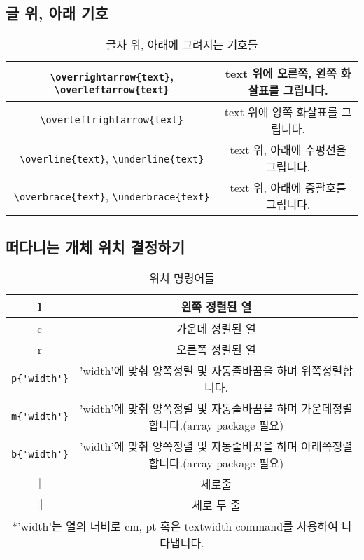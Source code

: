 \subsection{글 위, 아래 기호}
\begin{table}[hp]
	\centering
	\begin{tabular}{|c|c|}
		\hline
		\verb|\overrightarrow{text}|, \verb|\overleftarrow{text}| & text 위에 오른쪽, 왼쪽 화살표를 그립니다.\\
		\hline
		\verb|\overleftrightarrow{text}| & text 위에 양쪽 화살표를 그립니다.\\
		\hline
		\verb|\overline{text}|, \verb|\underline{text}| & text 위, 아래에 수평선을 그립니다.\\
		\hline
		\verb|\overbrace{text}|, \verb|\underbrace{text}| & text 위, 아래에 중괄호를 그립니다.\\
		\hline
	\end{tabular}
	\caption{글자 위, 아래에 그려지는 기호들}
	\label{tab:overunder}
\end{table}

\subsection{떠다니는 개체 위치 결정하기}
\begin{table}[hp]
	\centering
	\begin{tabular}{|c|c|}
		\hline
		l & 왼쪽 정렬된 열\\
		\hline
		c & 가운데 정렬된 열\\
		\hline
		r & 오른쪽 정렬된 열\\
		\hline
		\verb|p{'width'}| & 'width'에 맞춰 양쪽정렬 및 자동줄바꿈을 하며 위쪽정렬합니다.\\
		\hline
		\verb|m{'width'}| & 'width'에 맞춰 양쪽정렬 및 자동줄바꿈을 하며 가운데정렬합니다.(array package 필요)\\
		\hline
		\verb|b{'width'}| & 'width'에 맞춰 양쪽정렬 및 자동줄바꿈을 하며 아래쪽정렬합니다.(array package 필요)\\
		\hline
		$\mid$ & 세로줄\\
		\hline
		$\mid$$\mid$ & 세로 두 줄\\
		\hline
		\multicolumn{2}{c}{*'width'는 열의 너비로 cm, pt 혹은 textwidth command를 사용하여 나타냅니다.}
	\end{tabular}
	\caption{위치 명령어들}
	\label{tab:pos}
\end{table}

